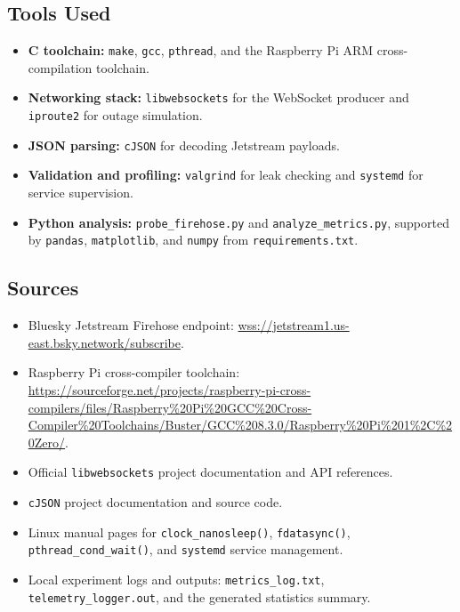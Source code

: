 \documentclass[12pt,a4paper]{article}
\begin{document}
\subsection{Tools Used}
\begin{itemize}
  \item \textbf{C toolchain:} \texttt{make}, \texttt{gcc}, \texttt{pthread}, and the Raspberry Pi ARM cross-compilation toolchain.
  \item \textbf{Networking stack:} \texttt{libwebsockets} for the WebSocket producer and \texttt{iproute2} for outage simulation.
  \item \textbf{JSON parsing:} \texttt{cJSON} for decoding Jetstream payloads.
  \item \textbf{Validation and profiling:} \texttt{valgrind} for leak checking and \texttt{systemd} for service supervision.
  \item \textbf{Python analysis:} \texttt{probe\_firehose.py} and \texttt{analyze\_metrics.py}, supported by \texttt{pandas}, \texttt{matplotlib}, and \texttt{numpy} from \texttt{requirements.txt}.
\end{itemize}

\subsection{Sources}
\begin{itemize}
  \item Bluesky Jetstream Firehose endpoint: \url{wss://jetstream1.us-east.bsky.network/subscribe}.
  \item Raspberry Pi cross-compiler toolchain: \url{https://sourceforge.net/projects/raspberry-pi-cross-compilers/files/Raspberry%20Pi%20GCC%20Cross-Compiler%20Toolchains/Buster/GCC%208.3.0/Raspberry%20Pi%201%2C%20Zero/}.
  \item Official \texttt{libwebsockets} project documentation and API references.
  \item \texttt{cJSON} project documentation and source code.
  \item Linux manual pages for \texttt{clock\_nanosleep()}, \texttt{fdatasync()}, \texttt{pthread\_cond\_wait()}, and \texttt{systemd} service management.
  \item Local experiment logs and outputs: \texttt{metrics\_log.txt}, \texttt{telemetry\_logger.out}, and the generated statistics summary.
\end{itemize}
\end{document}
